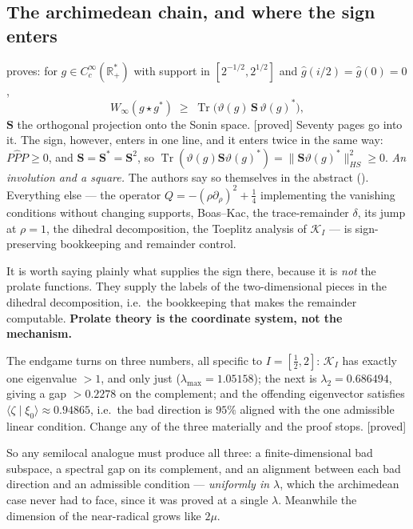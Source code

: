 \documentclass[11pt,a4paper]{article}
\theoremstyle{plain}
\theoremstyle{definition}
\theoremstyle{remark}
\newcommand{\st}[1]{{\normalfont\sffamily\footnotesize[#1]}}
\newcommand{\proved}{\st{proved}}
\newcommand{\R}{\mathbb{R}}
\newcommand{\Sonin}{\mathbf{S}}
\newcommand{\file}[1]{\path{#1}}
\begin{document}
\subsection{The archimedean chain, and where the sign enters}

\cite{CC2021} proves: for $g\in C_c^\infty(\R_+^*)$ with support in
$[2^{-1/2},2^{1/2}]$ and $\widehat g(i/2)=\widehat g(0)=0$,
\begin{equation}\label{eq:CC2021}
  W_\infty(g\star g^*)\;\ge\;\operatorname{Tr}\big(\vartheta(g)\,\Sonin\,\vartheta(g)^*\big),
\end{equation}
$\Sonin$ the orthogonal projection onto the Sonin space. \proved{} Seventy pages
go into it.  The sign, however, enters in one line, and it enters twice in the
same way: $P\widehat PP\ge0$, and $\Sonin=\Sonin^*=\Sonin^2$, so
$\operatorname{Tr}(\vartheta(g)\Sonin\vartheta(g)^*)=\|\Sonin\vartheta(g)^*\|_{HS}^2\ge0$.
\emph{An involution and a square.}  The authors say so themselves in the
abstract (\file{weil-compo.tex:86}).  Everything else --- the operator
$Q=-(\rho\partial_\rho)^2+\tfrac14$ implementing the vanishing conditions
without changing supports, Boas--Kac, the trace-remainder $\delta$, its jump at
$\rho=1$, the dihedral decomposition, the Toeplitz analysis of $\mathcal K_I$
--- is sign-preserving bookkeeping and remainder control.

It is worth saying plainly what supplies the sign there, because it is
\emph{not} the prolate functions.  They supply the labels of the
two-dimensional pieces in the dihedral decomposition, i.e.\ the bookkeeping that
makes the remainder computable.  \textbf{Prolate theory is the coordinate
system, not the mechanism.}

The endgame turns on three numbers, all specific to $I=[\tfrac12,2]$:
$\mathcal K_I$ has exactly one eigenvalue $>1$, and only just
($\lambda_{\max}=1.05158$); the next is $\lambda_2=0.686494$, giving a gap
$>0.2278$ on the complement; and the offending eigenvector satisfies
$\langle\zeta\mid\xi_0\rangle\approx0.94865$, i.e.\ the bad direction is $95\%$
aligned with the one admissible linear condition.  Change any of the three
materially and the proof stops. \proved{} \cite{CC2021}

So any semilocal analogue must produce all three: a finite-dimensional bad
subspace, a spectral gap on its complement, and an alignment between each bad
direction and an admissible condition --- \emph{uniformly in $\lambda$}, which
the archimedean case never had to face, since it was proved at a single
$\lambda$.  Meanwhile the dimension of the near-radical grows like $2\mu$.
\end{document}

